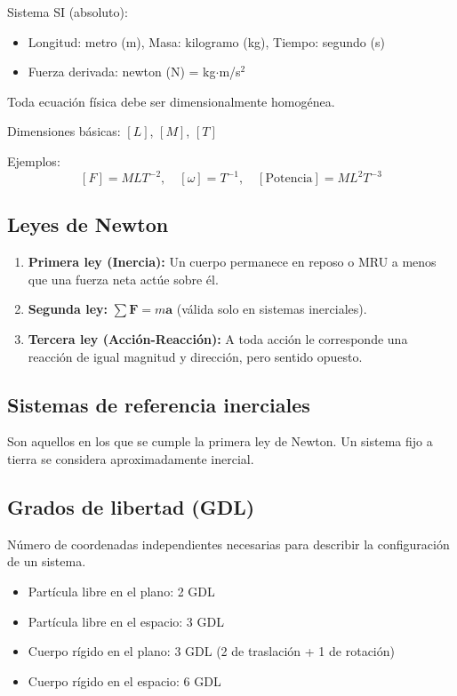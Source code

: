 \documentclass[12pt,a4paper]{article}
\begin{document}
Sistema SI (absoluto):
\begin{itemize}
    \item Longitud: metro (m), Masa: kilogramo (kg), Tiempo: segundo (s)
    \item Fuerza derivada: newton (N) = kg$\cdot$m/s$^2$
\end{itemize}

\begin{formbox}
Toda ecuación física debe ser dimensionalmente homogénea.

Dimensiones básicas: $[L]$, $[M]$, $[T]$

Ejemplos:
\[
[F] = MLT^{-2},\quad [\omega] = T^{-1},\quad [\text{Potencia}] = ML^2T^{-3}
\]
\end{formbox}

\subsection{Leyes de Newton}

\begin{enumerate}
    \item \textbf{Primera ley (Inercia):} Un cuerpo permanece en reposo o MRU
          a menos que una fuerza neta actúe sobre él.
    \item \textbf{Segunda ley:} $\displaystyle \sum \mathbf{F} = m\mathbf{a}$
          (válida solo en sistemas inerciales).
    \item \textbf{Tercera ley (Acción-Reacción):} A toda acción le corresponde
          una reacción de igual magnitud y dirección, pero sentido opuesto.
\end{enumerate}

\subsection{Sistemas de referencia inerciales}

Son aquellos en los que se cumple la primera ley de Newton. Un sistema fijo a
tierra se considera aproximadamente inercial.

\subsection{Grados de libertad (GDL)}

Número de coordenadas independientes necesarias para describir la configuración
de un sistema.

\begin{itemize}
    \item Partícula libre en el plano: 2 GDL
    \item Partícula libre en el espacio: 3 GDL
    \item Cuerpo rígido en el plano: 3 GDL (2 de traslación + 1 de rotación)
    \item Cuerpo rígido en el espacio: 6 GDL
\end{itemize}
\end{document}
